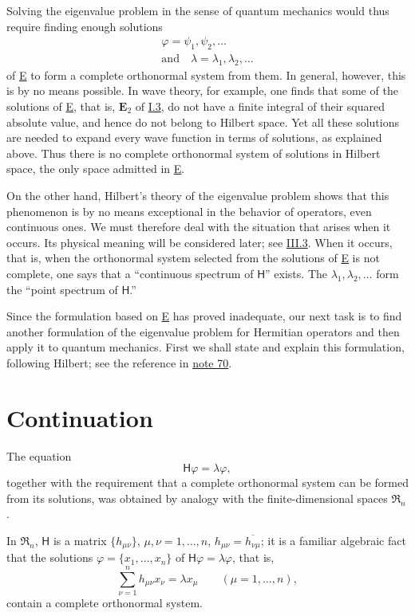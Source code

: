 \documentclass[fontsize=13pt,twoside,openany,headings=normal,parskip=false,bookmarkpackage=false,DIV=calc]{scrbook}
\begin{document}
Solving the eigenvalue problem in the sense of quantum mechanics would thus require finding enough solutions
\begin{gather*}
\varphi=\psi_1,\psi_2,\ldots\\
\text{and}\quad\lambda=\lambda_1,\lambda_2,\ldots
\end{gather*}
of \hyperref[eq:II.6.E]{E} to form a complete orthonormal system from them. In general, however, this is by no means possible. In wave theory, for example, one finds that some of the solutions of \hyperref[eq:II.6.E]{E}, that is, $\hyperref[eq:I.3.E2]{\mathbf{E}_2}$ of \hyperref[sec:I.3]{I.3}, do not have a finite integral of their squared absolute value, and hence do not belong to Hilbert space. Yet all these solutions are needed to expand every wave function in terms of solutions, as explained above. Thus there is no complete orthonormal system of solutions in Hilbert space, the only space admitted in \hyperref[eq:II.6.E]{E}.

On the other hand, Hilbert's theory of the eigenvalue problem shows that this phenomenon is by no means exceptional in the behavior of operators, even continuous ones. We must therefore deal with the situation that arises when it occurs. Its physical meaning will be considered later; see \hyperref[sec:III.3]{III.3}. When it occurs, that is, when the orthonormal system selected from the solutions of \hyperref[eq:II.6.E]{E} is not complete, one says that a ``continuous spectrum of $\mathsf H$'' exists. The $\lambda_1,\lambda_2,\ldots$ form the ``point spectrum of $\mathsf H$.''

\hypertarget{origpage-56}{}%
Since the formulation based on \hyperref[eq:II.6.E]{E} has proved inadequate, our next task is to find another formulation of the eigenvalue problem for Hermitian operators and then apply it to quantum mechanics. First we shall state and explain this formulation, following Hilbert; see the reference in \hyperlink{note-70}{note 70}.

\section{Continuation}\label{sec:II.7}
The equation
\[
\mathsf H\varphi=\lambda\varphi,
\]
together with the requirement that a complete orthonormal system can be formed from its solutions, was obtained by analogy with the finite-dimensional spaces $\mathfrak{R}_n$.

In $\mathfrak{R}_n$, $\mathsf H$ is a matrix $\{h_{\mu\nu}\}$, $\mu,\nu=1,\ldots,n$, $h_{\mu\nu}=\overline{h_{\nu\mu}}$; it is a familiar algebraic fact that the solutions $\varphi=\{x_1,\ldots,x_n\}$ of $\mathsf H\varphi=\lambda\varphi$, that is,
\[
\sum_{\nu=1}^n h_{\mu\nu}x_\nu=\lambda x_\mu\qquad(\mu=1,\ldots,n),
\]
contain a complete orthonormal system.
\end{document}
